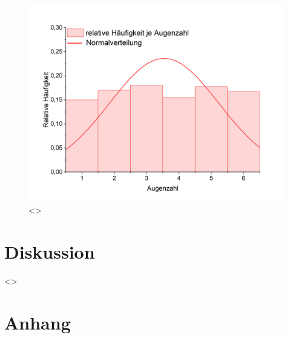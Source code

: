 \documentclass[a4paper,12pt]{article}
\begin{document}
\begin{figure}[H]
    \label{AbbAuswertung1}
    \centering
    \includegraphics[width=\textwidth]{bilder/Diagramm1.png}        %
    \caption{<>}                                                    %
\end{figure}

\section{Diskussion}

<>

\section{Anhang}
\label{sec:Anhang}
\end{document}
